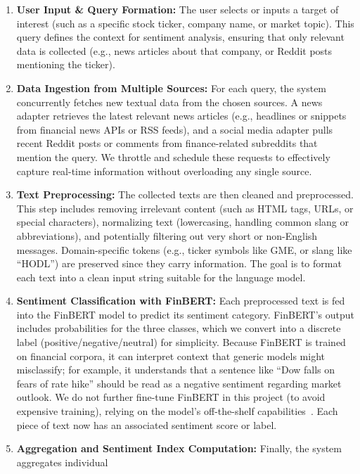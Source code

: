 \documentclass[12pt]{article}
\begin{document}
\begin{enumerate}
  \item \textbf{User Input \& Query Formation:} The user selects or inputs a target of interest (such as a
        specific stock ticker, company name, or market topic). This query defines the context for sentiment
        analysis, ensuring that only relevant data is collected (e.g., news articles about that company, or
        Reddit posts mentioning the ticker).
  \item \textbf{Data Ingestion from Multiple Sources:} For each query, the system concurrently fetches new
        textual data from the chosen sources. A news adapter retrieves the latest relevant news articles
        (e.g., headlines or snippets from financial news APIs or RSS feeds), and a social media adapter pulls
        recent Reddit posts or comments from finance-related subreddits that mention the query. We throttle
        and schedule these requests to effectively capture real-time information without overloading any
        single source.
  \item \textbf{Text Preprocessing:} The collected texts are then cleaned and preprocessed. This step
        includes removing irrelevant content (such as HTML tags, URLs, or special characters), normalizing
        text (lowercasing, handling common slang or abbreviations), and potentially filtering out very short
        or non-English messages. Domain-specific tokens (e.g., ticker symbols like GME, or slang like ``HODL'')
        are preserved since they carry information. The goal is to format each text into a clean input string
        suitable for the language model.
  \item \textbf{Sentiment Classification with FinBERT:} Each preprocessed text is fed into the FinBERT model
        to predict its sentiment category. FinBERT's output includes probabilities for the three classes,
        which we convert into a discrete label (positive/negative/neutral) for simplicity. Because FinBERT is
        trained on financial corpora, it can interpret context that generic models might misclassify; for
        example, it understands that a sentence like “Dow falls on fears of rate hike” should be read as a
        negative sentiment regarding market outlook. We do not further fine-tune FinBERT in this project (to
        avoid expensive training), relying on the model's off-the-shelf capabilities~\cite{araci2019finbert}.
        Each piece of text now has an associated sentiment score or label.
  \item \textbf{Aggregation and Sentiment Index Computation:} Finally, the system aggregates individual

\end{enumerate}
\end{document}
